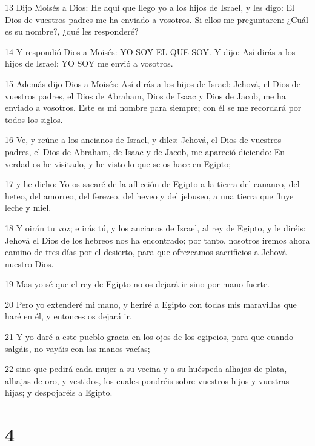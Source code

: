 \par 13 Dijo Moisés a Dios: He aquí que llego yo a los hijos de Israel, y les digo: El Dios de vuestros padres me ha enviado a vosotros. Si ellos me preguntaren: ¿Cuál es su nombre?, ¿qué les responderé?
\par 14 Y respondió Dios a Moisés: YO SOY EL QUE SOY. Y dijo: Así dirás a los hijos de Israel: YO SOY me envió a vosotros.
\par 15 Además dijo Dios a Moisés: Así dirás a los hijos de Israel: Jehová, el Dios de vuestros padres, el Dios de Abraham, Dios de Isaac y Dios de Jacob, me ha enviado a vosotros. Este es mi nombre para siempre; con él se me recordará por todos los siglos.
\par 16 Ve, y reúne a los ancianos de Israel, y diles: Jehová, el Dios de vuestros padres, el Dios de Abraham, de Isaac y de Jacob, me apareció diciendo: En verdad os he visitado, y he visto lo que se os hace en Egipto;
\par 17 y he dicho: Yo os sacaré de la aflicción de Egipto a la tierra del cananeo, del heteo, del amorreo, del ferezeo, del heveo y del jebuseo, a una tierra que fluye leche y miel.
\par 18 Y oirán tu voz; e irás tú, y los ancianos de Israel, al rey de Egipto, y le diréis: Jehová el Dios de los hebreos nos ha encontrado; por tanto, nosotros iremos ahora camino de tres días por el desierto, para que ofrezcamos sacrificios a Jehová nuestro Dios.
\par 19 Mas yo sé que el rey de Egipto no os dejará ir sino por mano fuerte.
\par 20 Pero yo extenderé mi mano, y heriré a Egipto con todas mis maravillas que haré en él, y entonces os dejará ir.
\par 21 Y yo daré a este pueblo gracia en los ojos de los egipcios, para que cuando salgáis, no vayáis con las manos vacías;
\par 22 sino que pedirá cada mujer a su vecina y a su huéspeda alhajas de plata, alhajas de oro, y vestidos, los cuales pondréis sobre vuestros hijos y vuestras hijas; y despojaréis a Egipto.

\chapter{4}

